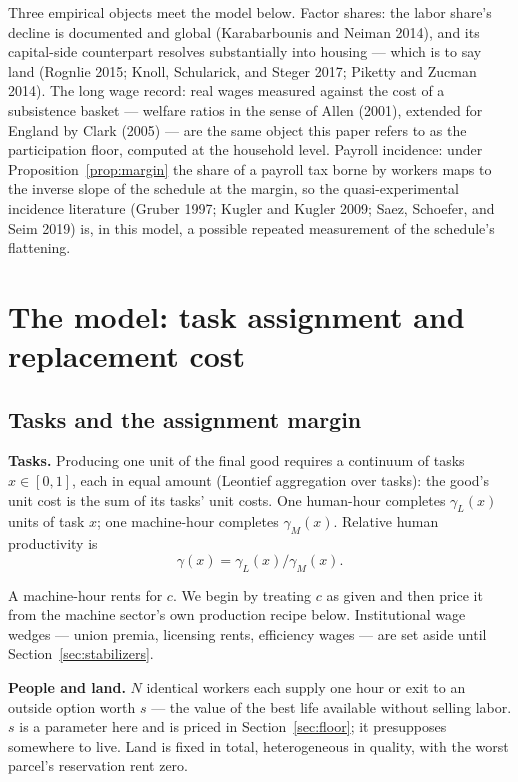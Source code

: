 \documentclass[12pt]{article}
\theoremstyle{plain}
\begin{document}
Three empirical objects meet the model below. Factor shares: the labor share's decline is documented and global (Karabarbounis and Neiman 2014), and its capital-side counterpart resolves substantially into housing --- which is to say land (Rognlie 2015; Knoll, Schularick, and Steger 2017; Piketty and Zucman 2014). The long wage record: real wages measured against the cost of a subsistence basket --- welfare ratios in the sense of Allen (2001), extended for England by Clark (2005) --- are the same object this paper refers to as the participation floor, computed at the household level. Payroll incidence: under Proposition~\ref{prop:margin} the share of a payroll tax borne by workers maps to the inverse slope of the schedule at the margin, so the quasi-experimental incidence literature (Gruber 1997; Kugler and Kugler 2009; Saez, Schoefer, and Seim 2019) is, in this model, a possible repeated measurement of the schedule's flattening.

\section{The model: task assignment and replacement cost}\label{sec:model}

\subsection{Tasks and the assignment margin}

\textbf{Tasks.} Producing one unit of the final good requires a continuum of tasks
$x \in [0,1]$, each in equal amount (Leontief aggregation over tasks): the good's
unit cost is the sum of its tasks' unit costs. One human-hour completes
$\gamma_L(x)$ units of task $x$; one machine-hour completes $\gamma_M(x)$.
Relative human productivity is
\begin{equation}\label{eq:gamma}
\gamma(x) = \gamma_L(x) / \gamma_M(x).
\end{equation}

A machine-hour rents for $c$. We begin by treating $c$ as given and then price it
from the machine sector's own production recipe below. Institutional wage wedges
--- union premia, licensing rents, efficiency wages --- are set aside until
Section~\ref{sec:stabilizers}.

\textbf{People and land.} $N$ identical workers each supply one hour or exit to an
outside option worth $s$ --- the value of the best life available without selling
labor. $s$ is a parameter here and is priced in Section~\ref{sec:floor}; it
presupposes somewhere to live. Land is fixed in total, heterogeneous in quality,
with the worst parcel's reservation rent zero.
\end{document}
